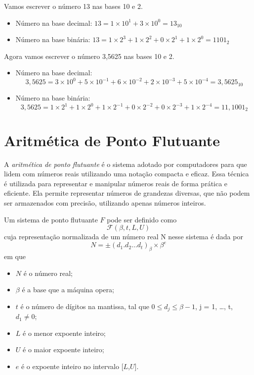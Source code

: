 \begin{ex}
  Vamos escrever o número 13 nas bases 10 e 2.
  \begin{itemize}
    \item Número na base decimal: $ 13 = 1 \times 10^1 + 3 \times 10^0 = 13_{10}$
    \item Número na base binária: $ 13 = 1 \times 2^3 + 1 \times 2^2 + 0 \times 2^1 + 1
            \times 2^0 = 1101_2$
  \end{itemize}
\end{ex}

\begin{ex}
  Agora vamos escrever o número 3,5625 nas bases 10 e 2.

  \begin{itemize}
    \item Número na base decimal:
          \[
            3{,}5625 = 3 \times 10^0 + 5 \times 10^{-1} + 6 \times 10^{-2} + 2 \times 10^{-3} + 5 \times 10^{-4} = 3{,}5625_{10}
          \]

    \item Número na base binária:
          \[
            3{,}5625 = 1\times 2^{1} + 1 \times 2^0 + 1 \times 2^{-1} + 0 \times 2^{-2} + 0 \times 2^{-3} + 1 \times 2^{-4} = 11{,}1001_2
          \]
  \end{itemize}
\end{ex}

\section{Aritmética de Ponto Flutuante}

A \textit{aritmética de ponto flutuante} é o sistema adotado por computadores
para que lidem com números reais utilizando uma notação compacta e eficaz. Essa
técnica é utilizada para representar e manipular números reais de forma prática
e eficiente. Ela permite representar números de grandezas diversas, que não
podem ser armazenados com precisão, utilizando apenas números inteiros.

Um sistema de ponto flutuante $F$ pode ser definido como
\[
  \mathcal{F}(\beta, t, L, U)\]
cuja representação normalizada de um número real N nesse sistema é dada por
\begin{equation}
  \label{eq:normalizedfp}
  N = \pm (d_{1}.d_{2} . . . d_{t})_{\beta} \times \beta^e
\end{equation}
em que
\begin{itemize}
  \item \( N \) é o número real;
  \item \(\beta\) é a base que a máquina opera;
  \item \( t \) é o número de dígitos na mantissa, tal que \( 0 \leq d_{j} \leq \beta-1 \), j = 1, \ldots, t, \(d_{1} \neq 0\);
  \item \( L \) é o menor expoente inteiro;
  \item \( U \) é o maior expoente inteiro;
  \item \( e \) é o expoente inteiro no intervalo [\( L \),\( U \)].
\end{itemize}

